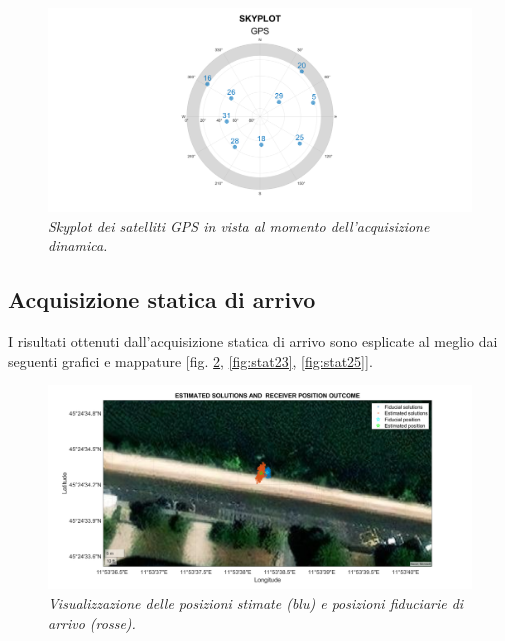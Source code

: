 \documentclass[a4paper,11pt,twoside]{book}
\begin{document}
	\begin{figure}[H]
		\centering
		\includegraphics[scale=0.25]{"Immagini workbook/Immagini esp3/din5"}
		\caption{\textit{Skyplot dei satelliti GPS in vista al momento dell'acquisizione dinamica.}}
		\label{fig:din5}
	\end{figure}

	\subsection{Acquisizione statica di arrivo}
	
	I risultati ottenuti dall'acquisizione statica di arrivo sono esplicate al meglio dai seguenti grafici e mappature [fig. \ref{fig:stat22}, \ref{fig:stat23}, \ref{fig:stat25}].
	
	\begin{figure}[H]
		\centering
		\includegraphics[scale=0.30]{"Immagini workbook/Immagini esp3/stat22"}
		\caption{\textit{Visualizzazione delle posizioni stimate (blu) e posizioni fiduciarie di arrivo (rosse).}}
		\label{fig:stat22}
	\end{figure}
	
	\vspace{-0.5cm}
	
\end{document}
